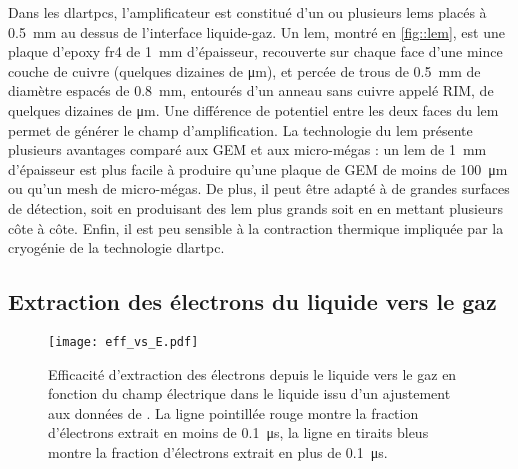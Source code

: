       Dans les \glspl{dlartpc}, l'amplificateur est constitué d'un ou plusieurs \glspl{lem} placés à \SI{0.5}{\milli\meter} au dessus de l'interface liquide-gaz. Un \gls{lem}, montré en \autoref{fig::lem}, est une plaque d'epoxy \gls{fr4} de \SI{1}{\milli\meter} d'épaisseur, recouverte sur chaque face d'une mince couche de cuivre (quelques dizaines de \si{\micro\meter}), et percée de trous de \SI{0.5}{\milli\meter} de diamètre espacés de \SI{0.8}{\milli\meter}, entourés d'un anneau sans cuivre appelé RIM, de quelques dizaines de \si{\micro\meter}. Une différence de potentiel entre les deux faces du \gls{lem} permet de générer le champ d'amplification. La technologie du \gls{lem} présente plusieurs avantages comparé aux GEM et aux micro-mégas : un \gls{lem} de \SI{1}{\milli\meter} d'épaisseur est plus facile à produire qu'une plaque de GEM de moins de \SI{100}{\micro\meter} ou qu'un mesh de micro-mégas. De plus, il peut être adapté à de grandes surfaces de détection, soit en produisant des \gls{lem} plus grands soit en en mettant plusieurs côte à côte. Enfin, il est peu sensible à la contraction thermique impliquée par la cryogénie de la technologie \gls{dlartpc}.

    \subsection{Extraction des électrons du liquide vers le gaz}\label{sec::extraction}

      \begin{figure}[htbp]
        \centering
        \texttt{[image: eff\_vs\_E.pdf]}
        \caption[Efficacité d'extraction des électrons depuis le liquide vers le gaz en fonction du champ électrique.]{\label{fig::guschin}Efficacité d'extraction des électrons depuis le liquide vers le gaz en fonction du champ électrique dans le liquide issu d'un ajustement aux données de \cite{guschin}. La ligne pointillée rouge montre la fraction d'électrons extrait en moins de \SI{0.1}{\micro\second}, la ligne en tiraits bleus montre la fraction d'électrons extrait en plus de \SI{0.1}{\micro\second}.}
      \end{figure}

